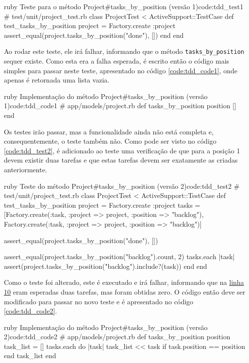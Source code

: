 \begin{mycode}{ruby}%
{Teste para o método Project\#tasks\_by\_position (versão 1)}{code:tdd_test1}
# test/unit/project_test.rb
class ProjectTest < ActiveSupport::TestCase
  def test_tasks_by_position
    project = Factory.create :project
    assert_equal(project.tasks_by_position("done"), [])
  end
end
\end{mycode}

Ao rodar este teste, ele irá falhar, informando que o método \texttt{tasks\_by\_position} sequer existe. Como esta era a falha esperada, é escrito então o código mais simples para passar neste teste, apresentado no código \ref{code:tdd_code1}, onde apenas é retornada uma lista vazia.

\begin{mycode}{ruby}%
{Implementação do método Project\#tasks\_by\_position (versão 1)}{code:tdd_code1}
# app/models/project.rb
def tasks_by_position position
  []
end
\end{mycode}

Os testes irão passar, mas a funcionalidade ainda não está completa e, consequentemente, o teste também não. Como pode ser visto no código \ref{code:tdd_test2}, é adicionado ao teste uma verificação de que para a posição 1 devem existir duas tarefas e que estas tarefas devem ser exatamente as criadas anteriormente.

\begin{mycode}{ruby}%
{Teste do método Project\#tasks\_by\_position (versão 2)}{code:tdd_test2}
# test/unit/project_test.rb
class ProjectTest < ActiveSupport::TestCase
  def test_tasks_by_position
    project = Factory.create :project
    tasks = [Factory.create(:task, :project => project, :position => "backlog"),
             Factory.create(:task, :project => project, :position => "backlog")]

    assert_equal(project.tasks_by_position("done"), [])

    assert_equal(project.tasks_by_position("backlog").count, 2)
    tasks.each { |task| assert(project.tasks_by_position("backlog").include?(task)) }
  end
end
\end{mycode}

Como o teste foi alterado, este é executado e irá falhar, informando que na \hyperref[code:tdd_test2]{linha 10} eram esperadas duas tarefas, mas foram obtidas zero. O código então deve ser modificado para passar no novo teste e é apresentado no código \ref{code:tdd_code2}.

\begin{mycode}{ruby}%
{Implementação do método Project\#tasks\_by\_position (versão 2)}{code:tdd_code2}
# app/models/project.rb
def tasks_by_position position
  task_list = []
  tasks.each do |task|
    task_list << task if task.position == position
  end
  task_list
end
\end{mycode}

